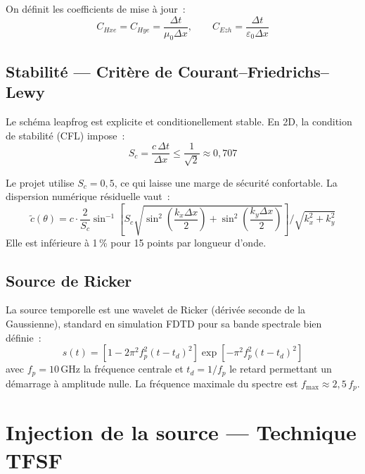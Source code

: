 \documentclass[12pt,a4paper]{article}
\newcommand{\eps}{\varepsilon}
\newcommand{\Sc}{S_c}
\newcommand{\dx}{\Delta x}
\newcommand{\dt}{\Delta t}
\numberwithin{equation}{section}
\numberwithin{figure}{section}
\numberwithin{table}{section}
\begin{document}
On définit les coefficients de mise à jour~:
\begin{equation}
    C_{Hxe} = C_{Hye} = \frac{\dt}{\mu_0 \dx}, \qquad
    C_{Ezh} = \frac{\dt}{\eps_0 \dx}
\end{equation}

\subsection{Stabilité --- Critère de Courant--Friedrichs--Lewy}

Le schéma leapfrog est explicite et conditionellement stable. En 2D,
la condition de stabilité (CFL) impose~:
\begin{equation}
    \Sc = \frac{c\,\dt}{\dx} \leq \frac{1}{\sqrt{2}} \approx 0{,}707
    \label{eq:CFL}
\end{equation}

Le projet utilise $\Sc = 0{,}5$, ce qui laisse une marge de sécurité confortable.
La dispersion numérique résiduelle vaut~:
\begin{equation}
    \tilde{c}(\theta) = c \cdot \frac{2}{\Sc}\sin^{-1}
    \!\left[\Sc \sqrt{\sin^2\!\left(\frac{k_x\dx}{2}\right)
                    + \sin^2\!\left(\frac{k_y\dx}{2}\right)}\right]
    \bigg/ \sqrt{k_x^2 + k_y^2}
\end{equation}
Elle est inférieure à 1\,\% pour 15 points par longueur d'onde.

\subsection{Source de Ricker}

La source temporelle est une wavelet de Ricker (dérivée seconde de la
Gaussienne), standard en simulation FDTD pour sa bande spectrale bien définie~:
\begin{equation}
    s(t) = \left[1 - 2\pi^2 f_p^2 (t-t_d)^2\right]
           \exp\!\left[-\pi^2 f_p^2 (t-t_d)^2\right]
    \label{eq:ricker}
\end{equation}
avec $f_p = 10\,\text{GHz}$ la fréquence centrale et
$t_d = 1/f_p$ le retard permettant un démarrage à amplitude nulle.
La fréquence maximale du spectre est $f_{\max} \approx 2{,}5\,f_p$.

\section{Injection de la source --- Technique TFSF}
\end{document}

